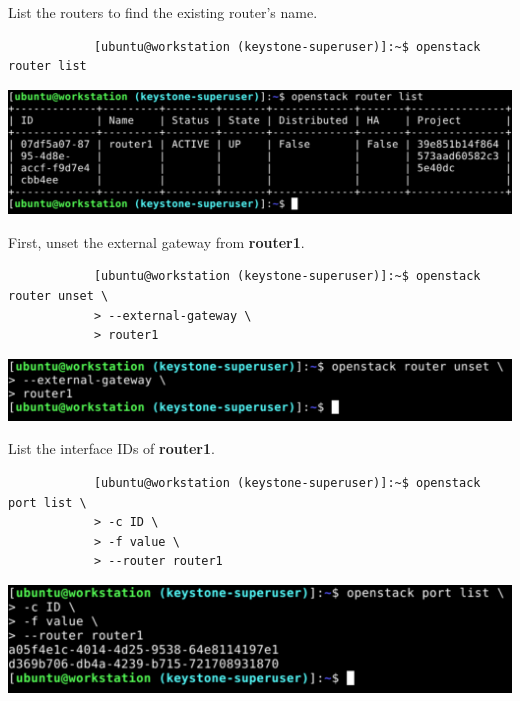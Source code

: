 \documentclass[letterpaper, 12pt]{article}
\begin{document}
\begin{enumerate}
    \begin{labstep}
        List the routers to find the existing router's name.
        \begin{lstlisting}
            [ubuntu@workstation (keystone-superuser)]:~$ openstack router list
        \end{lstlisting}

        \begin{center}
            \includegraphics[width=\linewidth]{images/part1/step15.png}
        \end{center}
    \end{labstep}

    \begin{labstep}
        First, unset the external gateway from \textbf{router1}.
        \begin{lstlisting}
            [ubuntu@workstation (keystone-superuser)]:~$ openstack router unset \
            > --external-gateway \
            > router1
        \end{lstlisting}

        \begin{center}
            \includegraphics[width=\linewidth]{images/part1/step16.png}
        \end{center}
    \end{labstep}

    \begin{labstep}
        List the interface IDs of \textbf{router1}.
        \begin{lstlisting}
            [ubuntu@workstation (keystone-superuser)]:~$ openstack port list \
            > -c ID \
            > -f value \
            > --router router1
        \end{lstlisting}

        \begin{center}
            \includegraphics[width=\linewidth]{images/part1/step17.png}
        \end{center}
    \end{labstep}


\end{enumerate}
\end{document}
